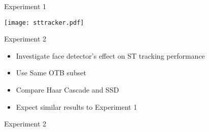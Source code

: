 \documentclass[mathserif, 14pt, xcolor=svgnames]{beamer}
\begin{document}
\bgroup
\begin{frame}{Experiment 1}
  \begin{center}
    \texttt{[image: sttracker.pdf]}
  \end{center}
\end{frame}
\egroup

\bgroup
\begin{frame}{Experiment 2}

    \begin{itemize}
       \setlength\itemsep{1.2em}
       \item \hspace{0pt}
         \pause Investigate face detector's effect on ST tracking performance
       \item \hspace{0pt}
         \pause Use Same OTB subset
       \item \hspace{0pt}
         \pause Compare Haar Cascade and SSD
       \item \hspace{0pt}
         \pause Expect similar results to Experiment 1
    \end{itemize}
\end{frame}
\egroup

\bgroup
\begin{frame}{Experiment 2}
  \begin{table}
    \caption{Face Detector's Effect on ST Tracking Performance}
  \end{table}
\end{frame}
\egroup
\end{document}
